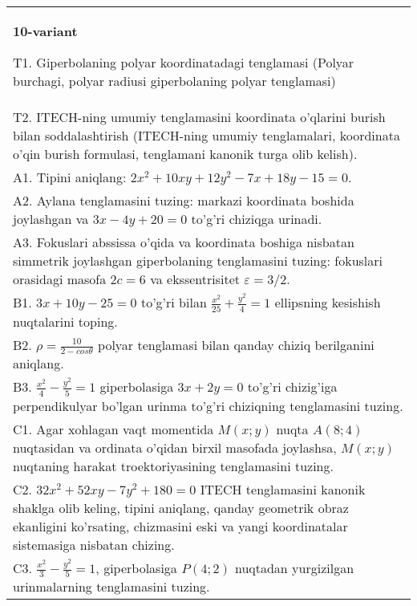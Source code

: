\documentclass{article}
\begin{document}
\begin{tabular}{m{17cm}}
\textbf{10-variant}
\newline

T1. Giperbolaning polyar koordinatadagi tenglamasi (Polyar burchagi, polyar radiusi giperbolaning polyar tenglamasi)\\

T2. ITECH-ning umumiy tenglamasini koordinata o'qlarini burish bilan soddalashtirish (ITECH-ning umumiy tenglamalari, koordinata o'qin burish formulasi, tenglamani kanonik turga olib kelish).\\

A1. Tipini aniqlang: $2x^{2}+10xy+12y^{2}-7x+18y-15=0$.\\

A2. Aylana tenglamasini tuzing: markazi koordinata boshida joylashgan va $3x-4y+20=0$ to'g'ri chiziqga urinadi.\\

A3. Fokuslari abssissa o'qida va koordinata boshiga nisbatan simmetrik joylashgan giperbolaning tenglamasini tuzing: fokuslari orasidagi masofa $2c=6$ va ekssentrisitet $\varepsilon=3/2$.\\

B1. $3x + 10y - 25 = 0$ to'g'ri bilan $\frac{x^{2}}{25} + \frac{y^{2}}{4} = 1$ ellipsning kesishish nuqtalarini toping.  \\

B2. $\rho = \frac{10}{2 - cos\theta}$ polyar tenglamasi bilan qanday chiziq berilganini aniqlang.  \\

B3. $\frac{x^{2}}{4} - \frac{y^{2}}{5} = 1$ giperbolasiga $3x + 2y = 0$ to'g'ri chizig'iga perpendikulyar bo'lgan urinma to'g'ri chiziqning tenglamasini tuzing.\\

C1. Agar xohlagan vaqt momentida $M(x;y)$ nuqta $A(8;4)$ nuqtasidan va ordinata o'qidan birxil masofada joylashsa, $M(x;y)$ nuqtaning harakat troektoriyasining tenglamasini tuzing.  \\

C2. $32x^{2} + 52xy - 7y^{2} + 180 = 0$ ITECH tenglamasini kanonik shaklga olib keling, tipini aniqlang, qanday geometrik obraz ekanligini ko'rsating, chizmasini eski va yangi koordinatalar sistemasiga nisbatan chizing.  \\

C3. $\frac{x^{2}}{3} - \frac{y^{2}}{5} = 1$, giperbolasiga $P(4;2)$ nuqtadan yurgizilgan urinmalarning tenglamasini tuzing.  \\

\end{tabular}
\vspace{1cm}
\end{document}
